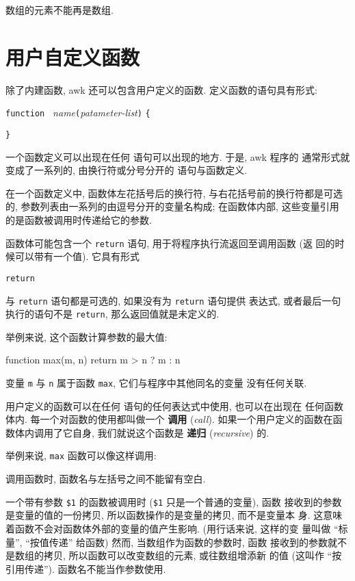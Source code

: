 数组的元素不能再是数组.

\section{用户自定义函数}
\label{sec:user_defined_functions}

除了内建函数, awk 还可以包含用户定义的函数. 定义函数的语句具有形式:
\begin{pattern}
    \verb'function ' \textit{name}\verb'('\textit{patameter-list}\verb')'
        \verb'{' \par
            \indent\indent\stmt \par
        \verb'}'
\end{pattern}
一个函数定义可以出现在任何 \patact 语句可以出现的地方. 于是, awk 程序的 
通常形式就变成了一系列的, 由换行符或分号分开的 \patact 语句与函数定义.

在一个函数定义中, 函数体左花括号后的换行符, 与右花括号前的换行符都是可选
的, 参数列表由一系列的由逗号分开的变量名构成; 在函数体内部, 这些变量引用
的是函数被调用时传递给它的参数.

函数体可能包含一个 \verb'return' 语句, 用于将程序执行流返回至调用函数 (返
回的时候可以带有一个值). 它具有形式
\begin{pattern}
    \verb'return '\expr
\end{pattern}
\expr 与 \verb'return' 语句都是可选的, 如果没有为 \verb'return' 语句提供 
表达式, 或者最后一句执行的语句不是 \verb'return', 那么返回值就是未定义的.

举例来说, 这个函数计算参数的最大值:
\begin{awkcode}
    function max(m, n) {
        return m > n ? m : n
    }
\end{awkcode}
变量 \verb'm' 与 \verb'n' 属于函数 \verb'max', 它们与程序中其他同名的变量
没有任何关联.

用户定义的函数可以在任何 \patact 语句的任何表达式中使用, 也可以在出现在
任何函数体内. 每一个对函数的使用都叫做一个 \textbf{调用} (\emph{call}).
如果一个用户定义的函数在函数体内调用了它自身, 
我们就说这个函数是 \textbf{递归}
(\emph{recursive}) 的.

举例来说, \verb'max' 函数可以像这样调用:
调用函数时, 函数名与左括号之间不能留有空白.

一个带有参数 \verb'$1' 的函数被调用时 (\verb'$1' 只是一个普通的变量), 函数 
接收到的参数是变量的值的一份拷贝, 所以函数操作的是变量的拷贝, 而不是变量本
身. 这意味着函数不会对函数体外部的变量的值产生影响. (用行话来说, 这样的变
量叫做 ``标量'', ``按值传递'' 给函数) 然而, 当数组作为函数的参数时, 函数 
接收到的参数就不是数组的拷贝, 所以函数可以改变数组的元素, 或往数组增添新
的值 (这叫作 ``按引用传递''). 函数名不能当作参数使用.

